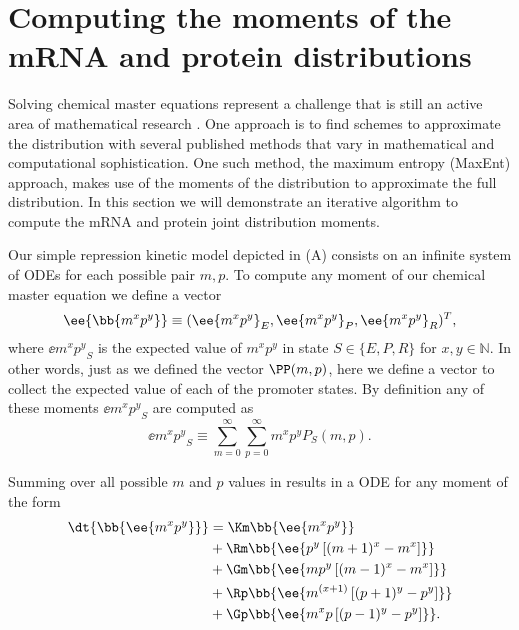 \section{Computing the moments of the mRNA and protein distributions}

Solving chemical master equations represent a challenge that is still an active
area of mathematical research \cite{Dinh2016}. One approach is to find schemes
to approximate the distribution with several published methods that vary in
mathematical and computational sophistication. One such method, the maximum
entropy (MaxEnt) approach, makes use of the moments of the distribution to
approximate the full distribution. In this section we will demonstrate an
iterative algorithm to compute the mRNA and protein joint distribution moments.

Our simple repression kinetic model depicted in (A)
consists on an infinite system of ODEs for each possible pair $m, p$. To
compute any moment of our chemical master equation we define a vector
\begin{equation}
	\ee{\bb{m^x p^y}} \equiv (\ee{m^x p^y}_E, \ee{m^x p^y}_P, \ee{m^x p^y}_R)^T,
\end{equation}
where $\ee{m^x p^y}_S$ is the expected value of $m^x p^y$ in state $S \in \{E,
P, R\}$ for $x, y \in \mathbb{N}$. In other words, just as we defined the vector
$\PP(m, p)$, here we define a vector to collect the expected value of each of
the promoter states. By definition any of these moments $\ee{m^x p^y}_S$ are
computed as
\begin{equation}
  \ee{m^x p^y}_S \equiv \sum_{m=0}^\infty \sum_{p=0}^\infty m^x p^y P_S(m, p).
  \label{eq_mom_def}
\end{equation}

Summing over all possible $m$ and $p$ values in  results in a ODE for any moment of the form 
\begin{equation}
  \begin{aligned}
    \dt{\bb{\ee{m^x p^y}}} &=
    \Km \bb{\ee{m^x p^y}}\\
    &+ \Rm \bb{\ee{p^y \left[ (m + 1)^x -m^x \right]}}\\
    &+ \Gm \bb{\ee{m p^y \left[ (m - 1)^x - m^x \right]}}\\
    &+ \Rp \bb{\ee{m^{(x + 1)} \left[ (p + 1)^y - p^y \right]}}\\
    &+ \Gp \bb{\ee{m^x p \left[ (p - 1)^y - p^y \right]}}.
    \label{eq_gral_mom}
  \end{aligned}
\end{equation}

